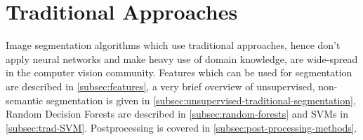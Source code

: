 
\newcommand\independent{\protect\mathpalette{\protect\independenT}{\perp}}
\def\independenT#1#2{\mathrel{\rlap{$#1#2$}\mkern2mu{#1#2}}}

\section{Traditional Approaches}\label{sec:traditional-approaches}%
Image segmentation algorithms which use traditional approaches, hence don't
apply neural networks and make heavy use of domain knowledge, are wide-spread
in the computer vision community. Features which can be used for segmentation
are described in \cref{subsec:features}, a very brief overview of unsupervised,
non-semantic segmentation is given in
\cref{subsec:unsupervised-traditional-segmentation}, Random Decision
Forests are described in \cref{subsec:random-forests}
 and \glspl{SVM} in
\cref{subsec:trad-SVM}.
Postprocessing is covered in \cref{subsec:post-processing-methods}.




% 




